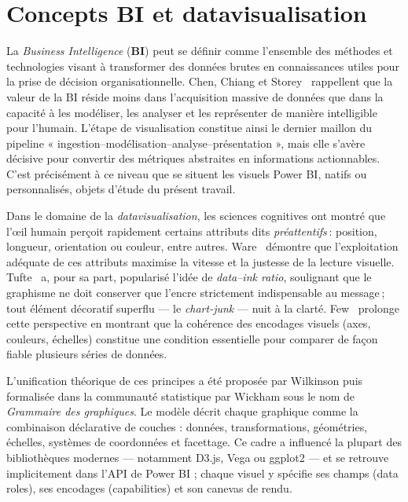 \section{Concepts BI et datavisualisation}
\label{sec:concepts-bi-dataviz}

La \textit{Business Intelligence} (\textbf{BI}) peut se définir comme l’ensemble des méthodes et technologies visant à transformer des données brutes en connaissances utiles pour la prise de décision organisationnelle. Chen, Chiang et Storey~\parencite{Chen2012} rappellent que la valeur de la BI réside moins dans l’acquisition massive de données que dans la capacité à les modéliser, les analyser et les représenter de manière intelligible pour l’humain. L’étape de visualisation constitue ainsi le dernier maillon du pipeline « ingestion–modélisation–analyse–présentation », mais elle s’avère décisive pour convertir des métriques abstraites en informations actionnables. C’est précisément à ce niveau que se situent les visuels Power BI, natifs ou personnalisés, objets d’étude du présent travail.

Dans le domaine de la \textit{datavisualisation}, les sciences cognitives ont montré que l’œil humain perçoit rapidement certains attributs dits \textit{préattentifs} : position, longueur, orientation ou couleur, entre autres. Ware~\parencite{Ware2019} démontre que l’exploitation adéquate de ces attributs maximise la vitesse et la justesse de la lecture visuelle. Tufte~\parencite{Tufte1983} a, pour sa part, popularisé l’idée de \textit{data–ink ratio}, soulignant que le graphisme ne doit conserver que l’encre strictement indispensable au message ; tout élément décoratif superflu — le \textit{chart-junk} — nuit à la clarté. Few~\parencite{Few2009} prolonge cette perspective en montrant que la cohérence des encodages visuels (axes, couleurs, échelles) constitue une condition essentielle pour comparer de façon fiable plusieurs séries de données.

L’unification théorique de ces principes a été proposée par Wilkinson \parencite{Wilkinson2005} puis formalisée dans la communauté statistique par Wickham sous le nom de \textit{Grammaire des graphiques}. Le modèle décrit chaque graphique comme la combinaison déclarative de couches : données, transformations, géométries, échelles, systèmes de coordonnées et facettage. Ce cadre a influencé la plupart des bibliothèques modernes — notamment D3.js, Vega ou ggplot2 — et se retrouve implicitement dans l’API de Power BI ; chaque visuel y spécifie ses champs (data roles), ses encodages (capabilities) et son canevas de rendu.

